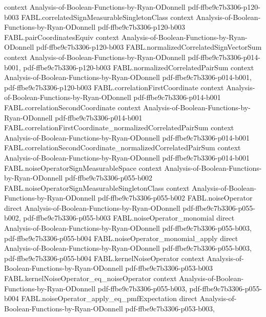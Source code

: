 \begin{theorem}
  {context}
  {Analysis-of-Boolean-Functions-by-Ryan-ODonnell}
  {pdf-ffbe9c7b3306-p120-b003}
\proofstep
  {FABL.correlatedSignMeasurableSingletonClass}
  {context}
  {Analysis-of-Boolean-Functions-by-Ryan-ODonnell}
  {pdf-ffbe9c7b3306-p120-b003}
\proofstep
  {FABL.pairCoordinatesEquiv}
  {context}
  {Analysis-of-Boolean-Functions-by-Ryan-ODonnell}
  {pdf-ffbe9c7b3306-p120-b003}
\proofstep
  {FABL.normalizedCorrelatedSignVectorSum}
  {context}
  {Analysis-of-Boolean-Functions-by-Ryan-ODonnell}
  {pdf-ffbe9c7b3306-p014-b001,
    pdf-ffbe9c7b3306-p120-b003}
\proofstep
  {FABL.normalizedCorrelatedPairSum}
  {context}
  {Analysis-of-Boolean-Functions-by-Ryan-ODonnell}
  {pdf-ffbe9c7b3306-p014-b001,
    pdf-ffbe9c7b3306-p120-b003}
\proofstep
  {FABL.correlationFirstCoordinate}
  {context}
  {Analysis-of-Boolean-Functions-by-Ryan-ODonnell}
  {pdf-ffbe9c7b3306-p014-b001}
\proofstep
  {FABL.correlationSecondCoordinate}
  {context}
  {Analysis-of-Boolean-Functions-by-Ryan-ODonnell}
  {pdf-ffbe9c7b3306-p014-b001}
\proofstep
  {FABL.correlationFirstCoordinate_normalizedCorrelatedPairSum}
  {context}
  {Analysis-of-Boolean-Functions-by-Ryan-ODonnell}
  {pdf-ffbe9c7b3306-p014-b001}
\proofstep
  {FABL.correlationSecondCoordinate_normalizedCorrelatedPairSum}
  {context}
  {Analysis-of-Boolean-Functions-by-Ryan-ODonnell}
  {pdf-ffbe9c7b3306-p014-b001}
\proofstep
  {FABL.noiseOperatorSignMeasurableSpace}
  {context}
  {Analysis-of-Boolean-Functions-by-Ryan-ODonnell}
  {pdf-ffbe9c7b3306-p055-b002}
\proofstep
  {FABL.noiseOperatorSignMeasurableSingletonClass}
  {context}
  {Analysis-of-Boolean-Functions-by-Ryan-ODonnell}
  {pdf-ffbe9c7b3306-p055-b002}
\proofstep
  {FABL.noiseOperator}
  {direct}
  {Analysis-of-Boolean-Functions-by-Ryan-ODonnell}
  {pdf-ffbe9c7b3306-p055-b002,
    pdf-ffbe9c7b3306-p055-b003}
\proofstep
  {FABL.noiseOperator_monomial}
  {direct}
  {Analysis-of-Boolean-Functions-by-Ryan-ODonnell}
  {pdf-ffbe9c7b3306-p055-b003,
    pdf-ffbe9c7b3306-p055-b004}
\proofstep
  {FABL.noiseOperator_monomial_apply}
  {direct}
  {Analysis-of-Boolean-Functions-by-Ryan-ODonnell}
  {pdf-ffbe9c7b3306-p055-b003,
    pdf-ffbe9c7b3306-p055-b004}
\proofstep
  {FABL.kernelNoiseOperator}
  {context}
  {Analysis-of-Boolean-Functions-by-Ryan-ODonnell}
  {pdf-ffbe9c7b3306-p053-b003}
\proofstep
  {FABL.kernelNoiseOperator_eq_noiseOperator}
  {context}
  {Analysis-of-Boolean-Functions-by-Ryan-ODonnell}
  {pdf-ffbe9c7b3306-p055-b003,
    pdf-ffbe9c7b3306-p055-b004}
\proofstep
  {FABL.noiseOperator_apply_eq_pmfExpectation}
  {direct}
  {Analysis-of-Boolean-Functions-by-Ryan-ODonnell}
  {pdf-ffbe9c7b3306-p053-b003,
}
\end{theorem}
